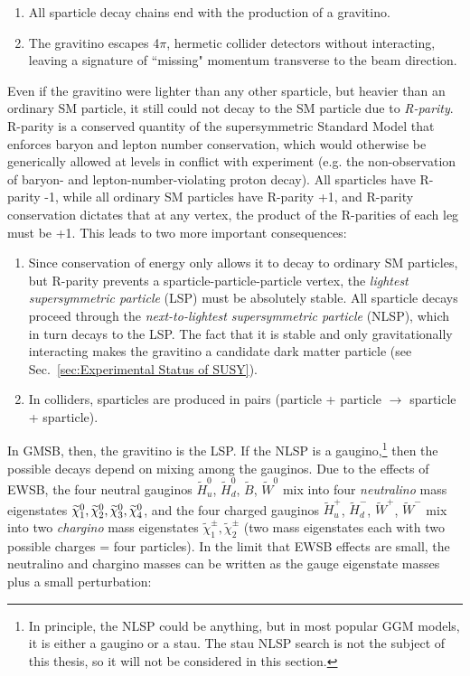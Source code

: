\documentclass[dissertation.tex]{subfiles}
\begin{document}
\begin{enumerate}
  \item All sparticle decay chains end with the production of a gravitino.
  \item The gravitino escapes 4$\pi$, hermetic collider detectors without interacting, leaving a signature of ``missing" momentum transverse to the beam direction.
\end{enumerate}

Even if the gravitino were lighter than any other sparticle, but heavier than an ordinary SM particle, it still could not decay to the SM particle due to \textit{R-parity}.  R-parity is a conserved quantity of the supersymmetric Standard Model that enforces baryon and lepton number conservation, which would otherwise be generically allowed at levels in conflict with experiment (e.g. the non-observation of baryon- and lepton-number-violating proton decay).  All sparticles have R-parity -1, while all ordinary SM particles have R-parity +1, and R-parity conservation dictates that at any vertex, the product of the R-parities of each leg must be +1.  This leads to two more important consequences:

\begin{enumerate}
  \item Since conservation of energy only allows it to decay to ordinary SM particles, but R-parity prevents a sparticle-particle-particle vertex, the \textit{lightest supersymmetric particle} (LSP) must be absolutely stable.  All sparticle decays proceed through the \textit{next-to-lightest supersymmetric particle} (NLSP), which in turn decays to the LSP.  The fact that it is stable and only gravitationally interacting makes the gravitino a candidate dark matter particle (see Sec.~\ref{sec:Experimental Status of SUSY}).
  \item In colliders, sparticles are produced in pairs (particle + particle $\rightarrow$ sparticle + sparticle).
\end{enumerate}

In GMSB, then, the gravitino is the LSP.  If the NLSP is a gaugino,\footnote{In principle, the NLSP could be anything, but in most popular GGM models, it is either a gaugino or a stau.  The stau NLSP search is not the subject of this thesis, so it will not be considered in this section.} then the possible decays depend on mixing among the gauginos.  Due to the effects of EWSB, the four neutral gauginos $\widetilde{H}_{u}^{0}$, $\widetilde{H}_{d}^{0}$, $\widetilde{B}$, $\widetilde{W}^{0}$ mix into four \textit{neutralino} mass eigenstates $\widetilde{\chi}_{1}^{0}, \widetilde{\chi}_{2}^{0}, \widetilde{\chi}_{3}^{0}, \widetilde{\chi}_{4}^{0}$, and the four charged gauginos $\widetilde{H}_{u}^{+}$, $\widetilde{H}_{d}^{-}$, $\widetilde{W}^{+}$, $\widetilde{W}^{-}$ mix into two \textit{chargino} mass eigenstates $\widetilde{\chi}_{1}^{\pm}, \widetilde{\chi}_{2}^{\pm}$ (two mass eigenstates each with two possible charges = four particles).  In the limit that EWSB effects are small, the neutralino and chargino masses can be written as the gauge eigenstate masses plus a small perturbation:
\end{document}
